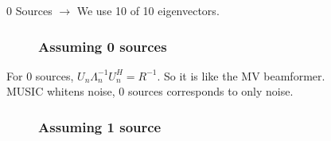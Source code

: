 \documentclass{beamer}
\begin{document}
\begin{frame}
	0 Sources $\rightarrow$ We use 10 of 10 eigenvectors.\\
	\begin{figure}
    	\frametitle{Assuming 0 sources}
    	\label{some example}
	\end{figure}
    For 0 sources, $U_n \Lambda_n^{-1} U^H_n = R^{-1}$. So it is like the MV beamformer.\\
    MUSIC whitens noise, 0 sources corresponds to only noise. 
\end{frame}

\begin{frame}
	\begin{figure}
    	\frametitle{Assuming 1 source}
    	\label{some example}
	\end{figure}
    
\end{frame}
\end{document}
